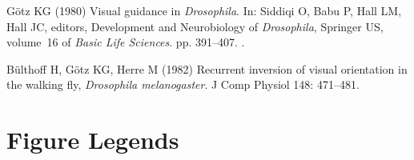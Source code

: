 \begin{thebibliography}{10}
	G{\"{o}}tz KG (1980) Visual guidance in \emph{Drosophila}.
	\newblock In: Siddiqi O, Babu P, Hall LM, Hall JC, editors, Development and
	Neurobiology of \emph{Drosophila}, Springer US, volume~16 of \emph{Basic Life
		Sciences}. pp. 391--407.
	\newblock {}.
	
	B\"{u}lthoff H, G\"{o}tz KG, Herre M (1982) Recurrent inversion of visual
	orientation in the walking fly, \emph{Drosophila melanogaster}.
	\newblock J Comp Physiol 148: 471--481.
	
\end{thebibliography}

\newpage
\section*{Figure Legends}
%

